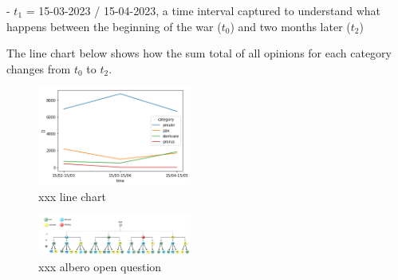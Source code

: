 \documentclass[sigchi]{acmart}
\begin{document}

- $t_1$ = 15-03-2023 / 15-04-2023, a time interval captured to understand what happens between the beginning of the war ($t_0$) and two months later ($t_2$)

The line chart below shows how the sum total of all opinions for each category changes from $t_0$ to $t_2$.

\begin{figure}[h]
\caption{xxx line chart}
\centering
\includegraphics[width=0.45\textwidth]{open_question_3}
\end{figure}


\begin{figure}[h]
\caption{xxx albero open question}
\centering
\includegraphics[width=0.45\textwidth]{open_question_4}
\end{figure}





\end{document}
